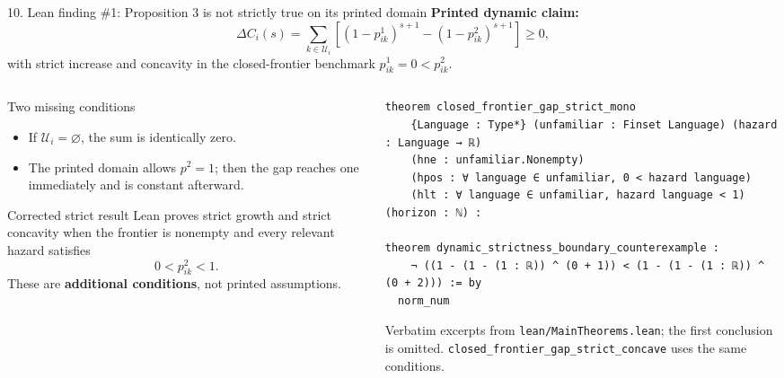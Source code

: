 \documentclass[aspectratio=169,10pt]{beamer}
\newcommand{\source}[1]{\textcolor{Slate}{\scriptsize #1}}
\begin{document}
\begin{frame}[fragile]{10. Lean finding \#1: Proposition 3 is not strictly true on its printed domain}
  \vspace{-0.06cm}
  \textbf{Printed dynamic claim:}
  \[
    \Delta C_i(s)=\sum_{k\in\mathcal U_i}
      \left[(1-p^1_{ik})^{s+1}-(1-p^2_{ik})^{s+1}\right]\ge0,
  \]
  with strict increase and concavity in the closed-frontier benchmark $p^1_{ik}=0<p^2_{ik}$.

  \vspace{-0.15cm}
  \begin{columns}[T,onlytextwidth]
    \begin{column}{0.40\textwidth}
      \begin{alertblock}{Two missing conditions}
        \scriptsize
        \begin{itemize}
          \item If $\mathcal U_i=\varnothing$, the sum is identically zero.
          \item The printed domain allows $p^2=1$; then the gap reaches one immediately and is constant afterward.
        \end{itemize}
      \end{alertblock}
      \begin{exampleblock}{Corrected strict result}
        \scriptsize Lean proves strict growth and strict concavity when the frontier is nonempty and every relevant hazard satisfies
        \[
          0<p^2_{ik}<1.
        \]
        These are \textbf{additional conditions}, not printed assumptions.
      \end{exampleblock}
    \end{column}
    \begin{column}{0.56\textwidth}
\begin{lstlisting}[basicstyle=\ttfamily\fontsize{7.0}{7.8}\selectfont]
theorem closed_frontier_gap_strict_mono
    {Language : Type*} (unfamiliar : Finset Language) (hazard : Language → ℝ)
    (hne : unfamiliar.Nonempty)
    (hpos : ∀ language ∈ unfamiliar, 0 < hazard language)
    (hlt : ∀ language ∈ unfamiliar, hazard language < 1) (horizon : ℕ) :

theorem dynamic_strictness_boundary_counterexample :
    ¬ ((1 - (1 - (1 : ℝ)) ^ (0 + 1)) < (1 - (1 - (1 : ℝ)) ^ (0 + 2))) := by
  norm_num
\end{lstlisting}
      \source{Verbatim excerpts from \texttt{lean/MainTheorems.lean}; the first conclusion is omitted. \texttt{closed\_frontier\_gap\_strict\_concave} uses the same conditions.}
    \end{column}
  \end{columns}
\end{frame}
\end{document}
